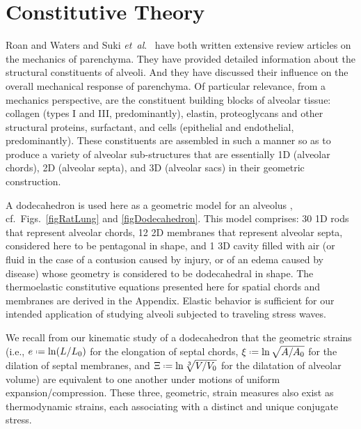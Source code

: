 \section{Constitutive Theory}
\label{partConstitutive}

Roan and Waters \cite{RoanWaters11} and Suki \textit{et~al}.\ \cite{Sukietal05,Sukietal11} have both written extensive review articles on the mechanics of parenchyma.  They have provided detailed information about the structural constituents of alveoli.  And they have discussed their influence on the overall mechanical response of parenchyma.  Of particular relevance, from a mechanics perspective, are the constituent building blocks of alveolar tissue: collagen (types I and III, predominantly), elastin, proteoglycans and other structural proteins, surfactant, and cells (epithelial and endothelial, predominantly).  These constituents are assembled in such a manner so as to produce a variety of alveolar sub-structures that are essentially 1D (alveolar chords), 2D (alveolar septa), and 3D (alveolar sacs) in their geometric construction.

A dodecahedron is used here as a geometric model for an alveolus \cite{FrankusLee74}, cf.\ Figs.~\ref{figRatLung} and \ref{figDodecahedron}.  This model comprises: 30 1D rods that represent alveolar chords, 12 2D membranes that represent alveolar septa, considered here to be pentagonal in shape, and 1 3D cavity filled with air (or fluid in the case of a contusion caused by injury, or of an edema caused by disease) whose geometry is considered to be dodecahedral in shape.  The thermo\-elastic constitutive equations presented here for spatial chords and membranes are derived in the Appendix.  Elastic behavior is sufficient for our intended application of studying alveoli subjected to traveling stress waves.

We recall from our kinematic study of a dodecahedron that the geometric strains (i.e., $e \defeq \ln ( L / L_0 )$ for the elongation of septal chords, $\xi \defeq \ln \sqrt{A / A_0}$ for the dilation of septal membranes, and $\Xi \defeq \ln \sqrt[3]{V / V_0}$ for the dilatation of alveolar volume) are equivalent to one another under motions of uniform expansion\slash compression.  These three, geometric, strain measures also exist as thermo\-dynamic strains, each associating with a distinct and unique conjugate stress. \cite{Freed17,FreedZamani19}

